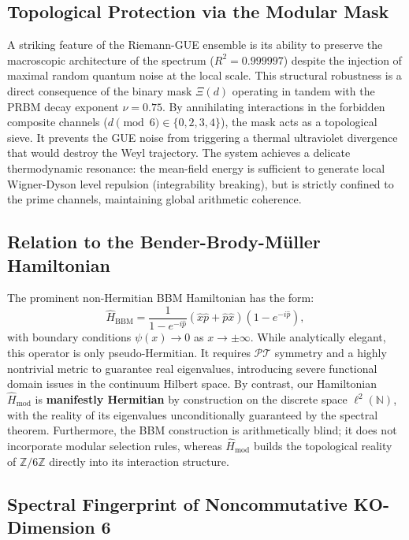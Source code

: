 \documentclass[aps,prl,preprint,superscriptaddress,floatfix]{revtex4-2}
\newcommand{\Zmod}{\mathbb{Z}/6\mathbb{Z}}
\begin{document}
\subsection{Topological Protection via the Modular Mask}

A striking feature of the Riemann-GUE ensemble is its ability to preserve the macroscopic architecture of the spectrum ($R^2 = 0.999997$) despite the injection of maximal random quantum noise at the local scale. This structural robustness is a direct consequence of the binary mask $\Xi(d)$ operating in tandem with the PRBM decay exponent $\nu = 0.75$. By annihilating interactions in the forbidden composite channels ($d \pmod 6 \in \{0, 2, 3, 4\}$), the mask acts as a topological sieve. It prevents the GUE noise from triggering a thermal ultraviolet divergence that would destroy the Weyl trajectory. The system achieves a delicate thermodynamic resonance: the mean-field energy is sufficient to generate local Wigner-Dyson level repulsion (integrability breaking), but is strictly confined to the prime channels, maintaining global arithmetic coherence.

\subsection{Relation to the Bender-Brody-M\"uller Hamiltonian}

The prominent non-Hermitian BBM Hamiltonian \cite{Bender2017} has the form:
\begin{equation}
\hat{H}_{\text{BBM}} = \frac{1}{1 - e^{-i\hat{p}}} (\hat{x}\hat{p} + \hat{p}\hat{x}) (1 - e^{-i\hat{p}}),
\end{equation}
with boundary conditions $\psi(x) \to 0$ as $x \to \pm\infty$. While analytically elegant, this operator is only pseudo-Hermitian. It requires $\mathcal{PT}$ symmetry and a highly nontrivial metric to guarantee real eigenvalues, introducing severe functional domain issues in the continuum Hilbert space. By contrast, our Hamiltonian $\hat{H}_{\text{mod}}$ is \textbf{manifestly Hermitian} by construction on the discrete space $\ell^2(\mathbb{N})$, with the reality of its eigenvalues unconditionally guaranteed by the spectral theorem. Furthermore, the BBM construction is arithmetically blind; it does not incorporate modular selection rules, whereas $\hat{H}_{\text{mod}}$ builds the topological reality of $\Zmod$ directly into its interaction structure.

\subsection{Spectral Fingerprint of Noncommutative KO-Dimension 6}
\end{document}
